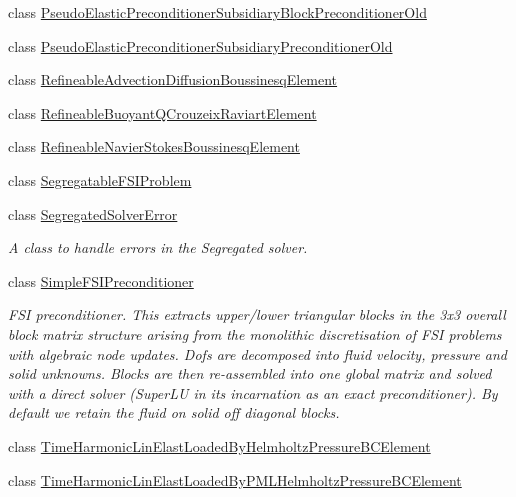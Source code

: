 \begin{DoxyCompactItemize}
class \hyperlink{classoomph_1_1PseudoElasticPreconditionerSubsidiaryBlockPreconditionerOld}{Pseudo\+Elastic\+Preconditioner\+Subsidiary\+Block\+Preconditioner\+Old}
\item 
class \hyperlink{classoomph_1_1PseudoElasticPreconditionerSubsidiaryPreconditionerOld}{Pseudo\+Elastic\+Preconditioner\+Subsidiary\+Preconditioner\+Old}
\item 
class \hyperlink{classoomph_1_1RefineableAdvectionDiffusionBoussinesqElement}{Refineable\+Advection\+Diffusion\+Boussinesq\+Element}
\item 
class \hyperlink{classoomph_1_1RefineableBuoyantQCrouzeixRaviartElement}{Refineable\+Buoyant\+Q\+Crouzeix\+Raviart\+Element}
\item 
class \hyperlink{classoomph_1_1RefineableNavierStokesBoussinesqElement}{Refineable\+Navier\+Stokes\+Boussinesq\+Element}
\item 
class \hyperlink{classoomph_1_1SegregatableFSIProblem}{Segregatable\+F\+S\+I\+Problem}
\item 
class \hyperlink{classoomph_1_1SegregatedSolverError}{Segregated\+Solver\+Error}
\begin{DoxyCompactList}\small\item\em A class to handle errors in the Segregated solver. \end{DoxyCompactList}\item 
class \hyperlink{classoomph_1_1SimpleFSIPreconditioner}{Simple\+F\+S\+I\+Preconditioner}
\begin{DoxyCompactList}\small\item\em F\+SI preconditioner. This extracts upper/lower triangular blocks in the 3x3 overall block matrix structure arising from the monolithic discretisation of F\+SI problems with algebraic node updates. Dofs are decomposed into fluid velocity, pressure and solid unknowns. Blocks are then re-\/assembled into one global matrix and solved with a direct solver (Super\+LU in its incarnation as an exact preconditioner). By default we retain the fluid on solid off diagonal blocks. \end{DoxyCompactList}\item 
class \hyperlink{classoomph_1_1TimeHarmonicLinElastLoadedByHelmholtzPressureBCElement}{Time\+Harmonic\+Lin\+Elast\+Loaded\+By\+Helmholtz\+Pressure\+B\+C\+Element}
\item 
class \hyperlink{classoomph_1_1TimeHarmonicLinElastLoadedByPMLHelmholtzPressureBCElement}{Time\+Harmonic\+Lin\+Elast\+Loaded\+By\+P\+M\+L\+Helmholtz\+Pressure\+B\+C\+Element}
\end{DoxyCompactItemize}
